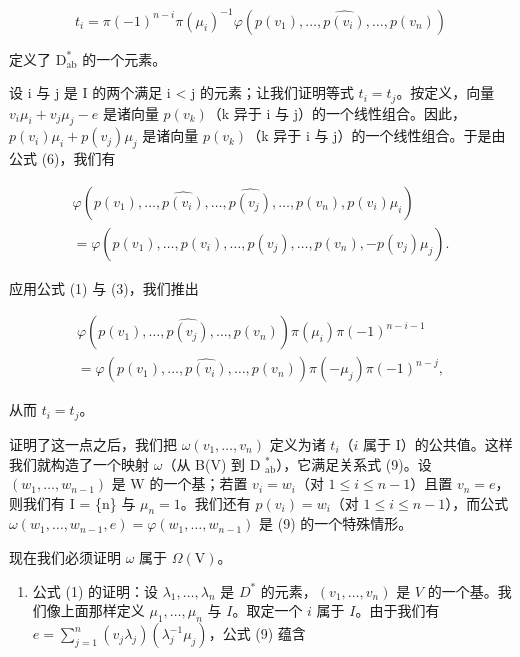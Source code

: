 \[
t _ {i} = \pi (- 1) ^ {n - i} \pi (\mu_ {i}) ^ {- 1} \varphi (p (v _ {1}), \ldots , \widehat {p (v _ {i})}, \ldots , p (v _ {n}))\tag{10}
\]

定义了 \(\mathrm{D}_{\mathrm{ab}}^{*}\) 的一个元素。

设 i 与 j 是 I 的两个满足 i \textless{} j 的元素；让我们证明等式 \(t_{i} = t_{j}\)。按定义，向量 \(v_{i}\mu_{i} + v_{j}\mu_{j} - e\) 是诸向量 \(p(v_{k})\)（k 异于 i 与 j）的一个线性组合。因此，\(p(v_{i})\mu_{i} + p(v_{j})\mu_{j}\) 是诸向量 \(p(v_{k})\)（k 异于 i 与 j）的一个线性组合。于是由公式 (6)，我们有

\[
\begin{array}{c} \varphi (p (v _ {1}), \ldots , \widehat {p (v _ {i})}, \ldots , \widehat {p (v _ {j})}, \ldots , p (v _ {n}), p (v _ {i}) \mu_ {i}) \\ = \varphi (p (v _ {1}), \ldots , \widehat {p (v _ {i})}, \ldots , \widehat {p (v _ {j})}, \ldots , p (v _ {n}), - p (v _ {j}) \mu_ {j}). \end{array}
\]

应用公式 (1) 与 (3)，我们推出

\[
\begin{array}{c} \varphi (p (v _ {1}), \ldots , \widehat {p (v _ {j})}, \ldots , p (v _ {n})) \pi (\mu_ {i}) \pi (- 1) ^ {n - i - 1} \\ = \varphi (p (v _ {1}), \ldots , \widehat {p (v _ {i})}, \ldots , p (v _ {n})) \pi (- \mu_ {j}) \pi (- 1) ^ {n - j}, \end{array}
\]

从而 \(t_i = t_j\)。

证明了这一点之后，我们把 \(\omega(v_1, \ldots, v_n)\) 定义为诸 \(t_i\)（\(i\) 属于 I）的公共值。这样我们就构造了一个映射 \(\omega\)（从 B(V) 到 D \(_{\text{ab}}^*\)），它满足关系式 (9)。设 \((w_1, \ldots, w_{n-1})\) 是 W 的一个基；若置 \(v_i = w_i\)（对 \(1 \leqslant i \leqslant n-1\)）且置 \(v_n = e\)，则我们有 I = \{n\} 与 \(\mu_n = 1\)。我们还有 \(p(v_i) = w_i\)（对 \(1 \leqslant i \leqslant n-1\)），而公式 \(\omega(w_1, \ldots, w_{n-1}, e) = \varphi(w_1, \ldots, w_{n-1})\) 是 (9) 的一个特殊情形。

现在我们必须证明 \(\omega\) 属于 \(\Omega (\mathrm{V})\)。

\begin{enumerate}
\def\labelenumi{\Alph{enumi})}
\setcounter{enumi}{2}
\tightlist
\item
  公式 (1) 的证明：设 \(\lambda_1, \ldots, \lambda_n\) 是 \(D^*\) 的元素，\((v_1, \ldots, v_n)\) 是 \(V\) 的一个基。我们像上面那样定义 \(\mu_1, \ldots, \mu_n\) 与 \(I\)。取定一个 \(i\) 属于 \(I\)。由于我们有 \(e = \sum_{j=1}^{n} (v_j \lambda_j)(\lambda_j^{-1} \mu_j)\)，公式 (9) 蕴含
\end{enumerate}

